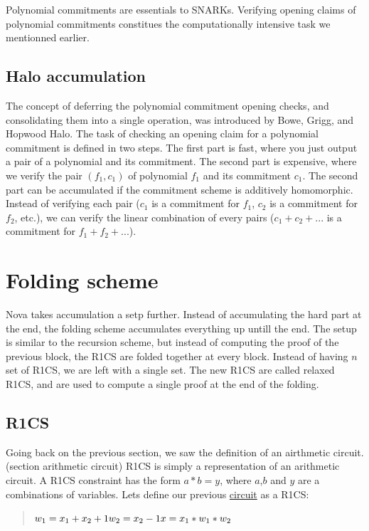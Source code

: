 Polynomial commitments are essentials to SNARKs. Verifying opening claims of polynomial commitments constitues the computationally intensive task we mentionned earlier. \cite{VR23}


\subsection{Halo accumulation}

The concept of deferring the polynomial commitment opening checks, and consolidating them into a single operation, was introduced by Bowe, Grigg, and Hopwood Halo.\cite{BGH23}
The task of checking an opening claim for a polynomial commitment is defined in two steps.
The first part is fast, where you just output a pair of a polynomial and its commitment. The second part is expensive, where we verify the pair $(f_1, c_1)$ of polynomial $f_1$ and its commitment $c_1$.
The second part can be accumulated if the commitment scheme is additively homomorphic. 
Instead of verifying each pair ($c_1$ is a commitment for $f_1$, $c_2$ is a commitment for $f_2$, etc.), we can verify the linear combination of every pairs ($c_1+c_2+...$ is a commitment for $f_1+f_2+...$). \cite{VR23}


\section{Folding scheme} 
Nova takes accumulation a setp further. Instead of accumulating the hard part at the end, the folding scheme accumulates everything up untill the end.
The setup is similar to the recursion scheme, but instead of computing the proof of the previous block, the R1CS are folded together at every block.
Instead of having $n$ set of R1CS, we are left with a single set. The new R1CS are called relaxed R1CS, and are used to compute a single proof at the end of the folding.
\cite{Nova23}  \cite{ASI23} 


\subsection{R1CS} 
Going back on the previous section, we saw the definition of an airthmetic circuit. (section arithmetic circuit)
R1CS is simply a representation of an arithmetic circuit.
A R1CS constraint has the form $a*b=y$, where $a$,$b$ and $y$ are a combinations of variables.
Lets define our previous \hyperref[subsec:ac]{circuit} as a R1CS:    

    \begin{quote}
    $w_1 = x_1+x_2+1
    \\
    w_2 = x_2 -1
    \\
    x = x_1*w_1*w_2$
    \end{quote}

